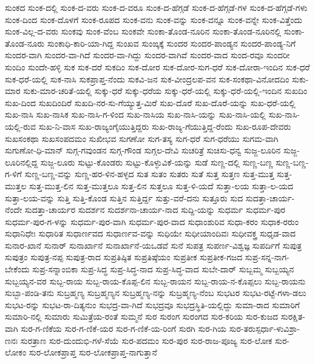 ಸುಂಕದ
ಸುಂಕ-ದಲ್ಲಿ
ಸುಂಕ-ದ-ವರು
ಸುಂಕ-ದ-ವರೂ
ಸುಂಕ-ದ-ಹೆಗ್ಗಡೆ
ಸುಂಕ-ದ-ಹೆಗ್ಗಡೆ-ಗಳ
ಸುಂಕ-ದ-ಹೆಗ್ಗಡೆ-ಗಳು
ಸುಂಕ-ದಿಂದ
ಸುಂಕ-ದೊಳಗೆ
ಸುಂಕ-ರೂಪದ
ಸುಂಕ-ವನು
ಸುಂಕ-ವನ್ನು
ಸುಂಕ-ವನ್ನೂ
ಸುಂಕ-ವನ್ನೇ
ಸುಂಕ-ವಿತ್ತೆಂದು
ಸುಂಕ-ವಿಲ್ಲ-ದ-ವರು
ಸುಂಕವು
ಸುಂಕ-ವೆಂಬ
ಸುಂಕವೇ
ಸುಂಕಾ-ತೊಂಡ-ನೂರಿನ
ಸುಂಕಾ-ತೊಂಡ-ನೂರಿನಲ್ಲಿ
ಸುಂಕಾ-ತೊಂಡ-ನೂರು
ಸುಂಕಾಧಿ-ಕಾರಿ-ಯಾ-ಗಿದ್ದ
ಸುಂಖವ
ಸುಂಙ್ಕಕ್ಕೆ
ಸುಂದರ
ಸುಂದರ-ಪಾಂಡ್ಯನ
ಸುಂದರ-ಪಾಂಡ್ಯ-ನಿಗೆ
ಸುಂದರ-ವಾಗಿ
ಸುಂದರ-ವಾ-ಗಿದೆ
ಸುಂದರ-ವಾ-ಗಿದ್ದು
ಸುಂದರ-ವಾಗಿವೆ
ಸುಂದರ-ವಾದ
ಸುಂದ-ರವೂ
ಸುಂದರೀ
ಸುಂದಿಂ
ಸುಂದೇ-ಹಳ್ಳಿ
ಸುಕ
ಸುಕ-ದರೆ
ಸುಕದಿಂ
ಸುಕ-ದೋರ
ಸುಕ-ದೋರ-ಸುಗ-ಧರೆ
ಸುಕ-ದೋರಾ-ಇಂದಿನ
ಸುಕ-ಧರೆ
ಸುಕ-ಧರೆ-ಯಲ್ಲಿ
ಸುಕ-ನಾಸಿ
ಸುಕಪ್ರಾಪ್ತ-ನೆಂದು
ಸುಕವಿ-ಜನ
ಸುಕ-ವೀಂದ್ರಲಪ-ವನ
ಸುಕ-ಸಂಕಥಾ-ವಿನೋದದಿಂ
ಸುಕು-ಮಾರ
ಸುಕು-ಮಾರ-ಚರಿತೆ-ಯಲ್ಲಿ
ಸುಕ್ಕು-ಧರೆ
ಸುಕ್ಕು-ಧರೆಯ
ಸುಕ್ಕು-ಧರೆ-ಯಲ್ಲಿ
ಸುಕ್ಕು-ಧರೆ-ಯಲ್ಲಿ-ಇಂದಿನ
ಸುಖದಿಂ
ಸುಖ-ದಿಂದ
ಸುಖದಿಂದಿರೆ
ಸುಖದಿ-ನರ-ಸು-ಗೆಯ್ಯುತ್ತ-ಮಿರೆ
ಸುಖ-ದೊರೆ
ಸುಖ-ದೊರೆ-ಯನ್ನು
ಸುಖ-ಧರೆ-ಯಲ್ಲಿ
ಸುಖ-ನಾಸಿ
ಸುಖ-ನಾಸಿಕ
ಸುಖ-ನಾಸಿ-ಗ-ಳಿಂದ
ಸುಖ-ನಾಸಿಯ
ಸುಖ-ನಾಸಿ-ಯನ್ನು
ಸುಖ-ನಾಸಿ-ಯಲ್ಲಿ
ಸುಖ-ನಾಸಿ-ಯಲ್ಲಿ-ರುವ
ಸುಖ-ನಿ-ವಾಸ
ಸುಖ-ರಾಜ್ಯಂಗೈಯುತ್ತಿದ್ದರು
ಸುಖ-ರಾಜ್ಯ-ಗೆಯುತ್ತಿದ್ದ-ರೆಂದು
ಸುಖ-ರೂಪ-ದೇವರು
ಸುಖಸಂಕಥಾ
ಸುಖಸಂಪದಮಂ
ಸುಖೀಭವ
ಸುಗಣೋ
ಸುಗ-ತಸ್ಯ
ಸುಗ-ಧರೆ
ಸುಗ-ಧರೆಯು
ಸುಗಮ-ವಾಗಿ
ಸುಗುಣೋ-ಧಿ-ಮಾನ್
ಸುಗ್ಗ-ಗವುಂಡನ
ಸುಗ್ಗ-ಗೌಂಡ
ಸುಗ್ಗಲ-ದೇವಿ
ಸುಚರಿತ್ರೆ
ಸುಚಿಸು-ಧನ್ವ
ಸುಜ್ಜ-ಲೂರಿನ
ಸುಜ್ಜ-ಲೂರಿನಲ್ಲಿದ್ದ
ಸುಜ್ಜ-ಲೂರು
ಸುಟ್ಟು-ಕೊಂಡರು
ಸುಟ್ಟು-ಕೊಳ್ಳುವಿಕೆ-ಯನ್ನು
ಸುಡೆ
ಸುಣ್ಣ-ದಲ್ಲಿ
ಸುಣ್ಣ-ಬಣ್ಣ
ಸುಣ್ಣ-ಬಣ್ಣ-ಗ-ಳಿಗೆ
ಸುಣ್ಣ-ಬಣ್ಣ-ವನ್ನು
ಸುಣ್ಣ-ಹರ-ಳಿನ-ಹಳ್ಳದ
ಸುತ
ಸುತಂ
ಸುತರು
ಸುತೆ
ಸುತ್ತ
ಸುತ್ತಣ
ಸುತ್ತ-ಮುತ್ತ
ಸುತ್ತ-ಮುತ್ತಲ
ಸುತ್ತ-ಮುತ್ತ-ಲಿನ
ಸುತ್ತ-ಮುತ್ತಲೂ
ಸುತ್ತ-ಲಿನ
ಸುತ್ತಲೂ
ಸುತ್ತ-ಳಿ-ಯದೆ
ಸುತ್ತಾ-ಲಯ
ಸುತ್ತಾ-ಲ-ಯದ
ಸುತ್ತಾ-ಲಯ-ವನ್ನು
ಸುತ್ತಿ
ಸುತ್ತಿ-ಕೊಂಡ
ಸುತ್ತಿನ
ಸುತ್ತಿರ್ದ್ದ
ಸುತ್ತು-ವರೆ-ದನು
ಸುತ್ತೂರು
ಸುದ
ಸುದತ್ತಾ-ಚಾರ್ಯ-ನೆಂದೇ
ಸುದತ್ತಾ-ಚಾರ್ಯರ
ಸುದರ್ಶನ
ಸುದರ್ಶನಾ-ಚಾರ್ಯ-ನಾದ
ಸುದ್ದಿ-ಯನ್ನು
ಸುಧರ್ಮ
ಸುಧರ್ಮ-ಪುರ
ಸುಧರ್ಮ-ಪುರ-ಗ-ಳನ್ನು
ಸುಧರ್ಮ-ಪುರ-ವಾಗಿ
ಸುಧರ್ಮ-ಪುರ-ವಾದ
ಸುಧಾಂಶುರಿವ
ಸುಧಾ-ಕರಂ
ಸುಧಾಕ-ರರುಂ
ಸುಧಾನಿಧೇಃ
ಸುಧಾರಿತ
ಸುಧಾರ್ಣವದ
ಸುಧಾರ್ಣವ-ವನ್ನು
ಸುಧಿಯೇ
ಸುಧೀಯಾಂದಿವಃ
ಸುಧೀವಕ್ತ್ರ
ಸುಧೃಡ-ವಾದ
ಸುನಾರ-ಖಾನೆ
ಸುನಾರ್
ಸುನಾರ್ಖಾನೆ
ಸುನಾರ್ಖಾನೆ-ಯಒಡವೆ
ಸುನೆ
ಸುಪತ್ರ
ಸುಪರ್ಣ-ವಿಶ್ವಜ್ಞ
ಸುಪರ್ದಿಗೆ
ಸುಪುತ್ರ
ಸುಪುತ್ರಂ
ಸುಪುತ್ರ-ನಪ್ಪ
ಸುಪುತ್ರ-ರಾದ
ಸುಪ್ರತಿಷ್ಠಿತ
ಸುಪ್ರತಿಷ್ಠೆಯಂ
ಸುಪ್ರತೀಕ
ಸುಪ್ರತೀಕ-ಗಜದ
ಸುಪ್ರ-ಸನ್ನ-ನಾಗ-ಬೇಕೆಂದು
ಸುಪ್ರ-ಸನ್ನಾಂಬಿಕಾ
ಸುಪ್ರ-ಸಿದ್ಧ
ಸುಪ್ರ-ಸಿದ್ಧ-ನಾದ
ಸುಪ್ರ-ಸಿದ್ಧ-ವಾದ
ಸುಬೇ-ದಾರ್
ಸುಬ್ಬಮ್ಮ
ಸುಬ್ಬಯ್ಯನ
ಸುಬ್ಬಯ್ಯನ-ವರ
ಸುಬ್ಬ-ರಾಯ
ಸುಬ್ಬ-ರಾಯ-ಕೊಪ್ಪ-ಲಿನ
ಸುಬ್ಬ-ರಾಯನ
ಸುಬ್ಬ-ರಾಯ-ನ-ಕೊಪ್ಪಲು
ಸುಬ್ಬ-ರಾಯನು
ಸುಬ್ಬಾ-ಪಂಡಿ-ತನು
ಸುಬ್ರಹ್ಮಣ್ಯ
ಸುಬ್ರಹ್ಮಣ್ಯನ
ಸುಬ್ರಹ್ಮಣ್ಯ-ನನ್ನು
ಸುಬ್ರಹ್ಮಣ್ಯ-ನೆಂಬ
ಸುಭಟರ
ಸುಭಟ-ರಟ್ಟೆ-ಗಳಾ-ಡಲು
ಸುಭಟ-ರನ್ನು
ಸುಭಟ-ರಾ-ದಿತ್ಯನುಂ
ಸುಭದ್ರ-ವಾ-ಗಿದೆ
ಸುಭದ್ರವೂ
ಸುಭದ್ರಸ್ಥಿತಿ-ಯಲ್ಲಿದ್ದು
ಸುಮಾ-ರಾದ
ಸುಮಾರಿಗೆ
ಸುಮಾರಿ-ನಲ್ಲಿ
ಸುಮಾರು
ಸುಮಿತ್ರೆಯ-ರಂತೆ
ಸುಮ್ಮನೆ
ಸುರ
ಸುರಂಗ
ಸುರಂಗದ
ಸುರ-ಕರಿಯ
ಸುರ-ಕುಜದ
ಸುರಕ್ಷಿತ-ವಾಗಿ
ಸುರ-ಗ-ಣಿಕೆಯ
ಸುರ-ಗ-ಣಿಕೆ-ಯರ
ಸುರ-ಗ-ಣಿಕೆ-ಯ-ರಿಂಗೆ
ಸುರಗಿ
ಸುರ-ಗಿಯ
ಸುರ-ತರುಸ್ಪರ್ಧಾ-ಳುವಿಶ್ರಾ-ಣನಃ
ಸುರತ್ರಾಣ
ಸುರ-ದುಂದುಭಿ-ಗಳೆ-ಸೆಯೆ
ಸುರ-ಪದಮಂ
ಸುರ-ಪುರ
ಸುರ-ರಾಜ-ಪೂಜ್ಯ
ಸುರ-ಲೋಕ
ಸುರ-ಲೋಕಂ
ಸುರ-ಲೋಕಪ್ರಾಪ್ತ
ಸುರ-ಲೋಕಪ್ರಾಪ್ತ-ನಾಗುತ್ತಾನೆ
